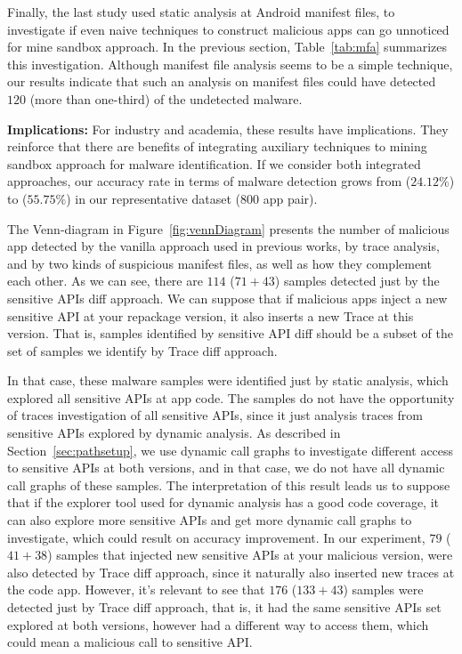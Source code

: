 Finally, the last study used static analysis at Android manifest files, to investigate if even naive techniques to construct malicious apps can go unnoticed for mine sandbox approach. In the previous section, Table~\ref{tab:mfa} summarizes this investigation. Although manifest file analysis seems to be a simple technique, our results indicate that such an analysis on manifest files could have detected $120$ (more than one-third) of the undetected malware.

\textbf{Implications: }For industry and academia, these results have implications. They reinforce that there are benefits of integrating auxiliary techniques to mining sandbox approach for malware identification. 
If we consider both integrated approaches, our accuracy rate in terms of malware detection grows from ($24.12\%$) to ($55.75\%$) in our representative dataset ($800$ app pair). %

The Venn-diagram in Figure~\ref{fig:vennDiagram} presents the number of malicious app detected by the vanilla approach used in previous works, by trace analysis, and by two kinds of suspicious manifest files, as well as how they complement each other. As we can see, there are $114$ ($71+43$) samples detected just by the sensitive APIs diff approach. We can suppose that if malicious apps inject a new sensitive API at your repackage version, it also inserts a new Trace at this version. That is, samples identified by sensitive API diff should be a subset of the set of samples we identify by Trace diff approach. 

In that case, these malware samples were identified just by static analysis, which explored all sensitive APIs at app code. The samples do not have the opportunity of traces investigation of all sensitive APIs, since it just analysis traces from sensitive APIs explored by dynamic analysis. As described in Section~\ref{sec:pathsetup}, we use dynamic call graphs to investigate different access to sensitive APIs at both versions, and in that case, we do not have all dynamic call graphs of these samples. The interpretation of this result leads us to suppose that if the explorer tool used for dynamic analysis has a good code coverage, it can also explore more sensitive APIs and get more dynamic call graphs to investigate, which could result on accuracy improvement. In our experiment, $79$ ($41+38$) samples that injected new sensitive APIs at your malicious version, were also detected by Trace diff approach, since it naturally also inserted new traces at the code app. However, it's relevant to see that $176$ ($133+43$) samples were detected just by Trace diff approach, that is, it had the same sensitive APIs set explored at both versions, however had a different way to access them, which could mean a malicious call to sensitive API.


